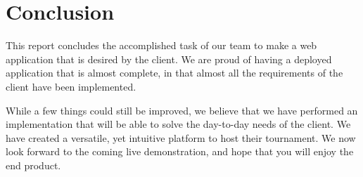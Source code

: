 \section{Conclusion}
\label{sec:Conclusion}


This report concludes the accomplished task of our team to make a web
application that is desired by the client. We are proud of having a
deployed application that is almost complete, in that almost all the
requirements of the client have been implemented.\newline

While a few things could still be improved, we believe that we have performed
an implementation that will be able to solve the day-to-day needs of the
client. We have created a versatile, yet intuitive platform to host their
tournament. We now look forward to the coming live demonstration, and hope that
you will enjoy the end product.